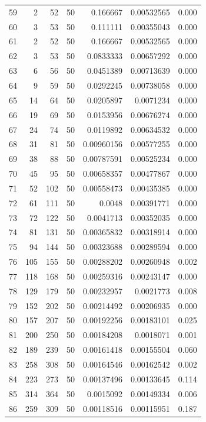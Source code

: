 \begin{tabular}{r r r r r r r}
59 & 2 & 52 & 50 & 0.166667 & 0.00532565 & 0.000 \\
60 & 3 & 53 & 50 & 0.111111 & 0.00355043 & 0.000 \\
61 & 2 & 52 & 50 & 0.166667 & 0.00532565 & 0.000 \\
62 & 3 & 53 & 50 & 0.0833333 & 0.00657292 & 0.000 \\
63 & 6 & 56 & 50 & 0.0451389 & 0.00713639 & 0.000 \\
64 & 9 & 59 & 50 & 0.0292245 & 0.00738058 & 0.000 \\
65 & 14 & 64 & 50 & 0.0205897 & 0.0071234 & 0.000 \\
66 & 19 & 69 & 50 & 0.0153956 & 0.00676274 & 0.000 \\
67 & 24 & 74 & 50 & 0.0119892 & 0.00634532 & 0.000 \\
68 & 31 & 81 & 50 & 0.00960156 & 0.00577255 & 0.000 \\
69 & 38 & 88 & 50 & 0.00787591 & 0.00525234 & 0.000 \\
70 & 45 & 95 & 50 & 0.00658357 & 0.00477867 & 0.000 \\
71 & 52 & 102 & 50 & 0.00558473 & 0.00435385 & 0.000 \\
72 & 61 & 111 & 50 & 0.0048 & 0.00391771 & 0.000 \\
73 & 72 & 122 & 50 & 0.0041713 & 0.00352035 & 0.000 \\
74 & 81 & 131 & 50 & 0.00365832 & 0.00318914 & 0.000 \\
75 & 94 & 144 & 50 & 0.00323688 & 0.00289594 & 0.000 \\
76 & 105 & 155 & 50 & 0.00288202 & 0.00260948 & 0.002 \\
77 & 118 & 168 & 50 & 0.00259316 & 0.00243147 & 0.000 \\
78 & 129 & 179 & 50 & 0.00232957 & 0.0021773 & 0.008 \\
79 & 152 & 202 & 50 & 0.00214492 & 0.00206935 & 0.000 \\
80 & 157 & 207 & 50 & 0.00192256 & 0.00183101 & 0.025 \\
81 & 200 & 250 & 50 & 0.00184208 & 0.0018071 & 0.001 \\
82 & 189 & 239 & 50 & 0.00161418 & 0.00155504 & 0.060 \\
83 & 258 & 308 & 50 & 0.00164546 & 0.00162542 & 0.002 \\
84 & 223 & 273 & 50 & 0.00137496 & 0.00133645 & 0.114 \\
85 & 314 & 364 & 50 & 0.0015092 & 0.00149334 & 0.006 \\
86 & 259 & 309 & 50 & 0.00118516 & 0.00115951 & 0.187 \\

\end{tabular}
